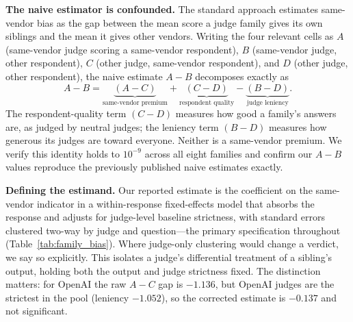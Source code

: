 \documentclass{article}
\begin{document}
\textbf{The naive estimator is confounded.} The standard approach estimates same-vendor bias as the gap between the mean score a judge family gives its own siblings and the mean it gives other vendors. Writing the four relevant cells as $A$ (same-vendor judge scoring a same-vendor respondent), $B$ (same-vendor judge, other respondent), $C$ (other judge, same-vendor respondent), and $D$ (other judge, other respondent), the naive estimate $A - B$ decomposes exactly as
\[
A - B = \underbrace{(A - C)}_{\text{same-vendor premium}} + \underbrace{(C - D)}_{\text{respondent quality}} - \underbrace{(B - D)}_{\text{judge leniency}}.
\]
The respondent-quality term $(C-D)$ measures how good a family's answers are, as judged by neutral judges; the leniency term $(B-D)$ measures how generous its judges are toward everyone. Neither is a same-vendor premium. We verify this identity holds to $10^{-9}$ across all eight families and confirm our $A-B$ values reproduce the previously published naive estimates exactly.

\textbf{Defining the estimand.} Our reported estimate is the coefficient on the same-vendor indicator in a within-response fixed-effects model that absorbs the response and adjusts for judge-level baseline strictness, with standard errors clustered two-way by judge and question---the primary specification throughout (Table~\ref{tab:family_bias}). Where judge-only clustering would change a verdict, we say so explicitly. This isolates a judge's differential treatment of a sibling's output, holding both the output and judge strictness fixed. The distinction matters: for OpenAI the raw $A - C$ gap is $-1.136$, but OpenAI judges are the strictest in the pool (leniency $-1.052$), so the corrected estimate is $-0.137$ and not significant.
\end{document}
